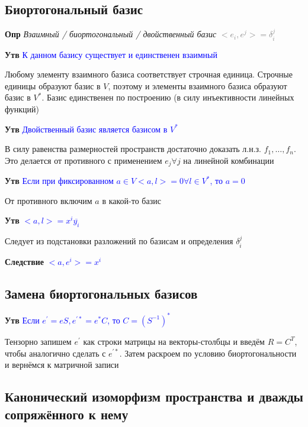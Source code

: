 \documentclass[a4paper, 14pt]{article}
\begin{document}
    \subsection{Биортогональный базис}
    
    \textbf{Опр} \textit{Взаимный / биортогональный / двойственный базис} \textcolor{gray}{$<e_i, e^j> = \delta_i^j$}
    
    \textbf{Утв} \textcolor{blue}{К данном базису существует и единственен взаимный}
    
    Любому элементу взаимного базиса соответствует строчная единица.
    Строчные единицы образуют базис в $V$, поэтому и элементы взаимного базиса образуют базис в $V^*$.
    Базис единственен по построению (в силу инъективности линейных функций)
    
    \textbf{Утв} \textcolor{blue}{Двойственный базис является базисом в $V^*$}
    
    В силу равенства размерностей пространств достаточно доказать л.н.з. $f_1, \dots, f_n$.
    Это делается от противного с применением $e_j \forall j$ на линейной комбинации
    
    \textbf{Утв} \textcolor{blue}{Если при фиксированном $a \in V <a, l> = 0 \forall l \in V^*$, то $a = 0$}
    
    От противного включим $a$ в какой-то базис
    
    \textbf{Утв} \textcolor{blue}{$<a, l> = x^i \overline{y_i}$}
    
    Следует из подстановки разложений по базисам и определения $\delta_i^j$
    
    \textbf{Следствие} \textcolor{blue}{$<a, e^i> = x^i$}
    
    \subsection{Замена биортогональных базисов}
    
    \textbf{Утв} \textcolor{blue}{Если $e^{'} = eS, e^{'*} = e^* C$, то $C = (S^{-1})^*$}
    
    Тензорно запишем $e^{'}$ как строки матрицы на векторы-столбцы и введём $R = C^T$, чтобы аналогично сделать с $e^{'*}$.
    Затем раскроем по условию биортогональности и вернёмся к матричной записи
    
    \subsection{Канонический изоморфизм пространства и дважды сопряжённого к нему}
    
\end{document}
